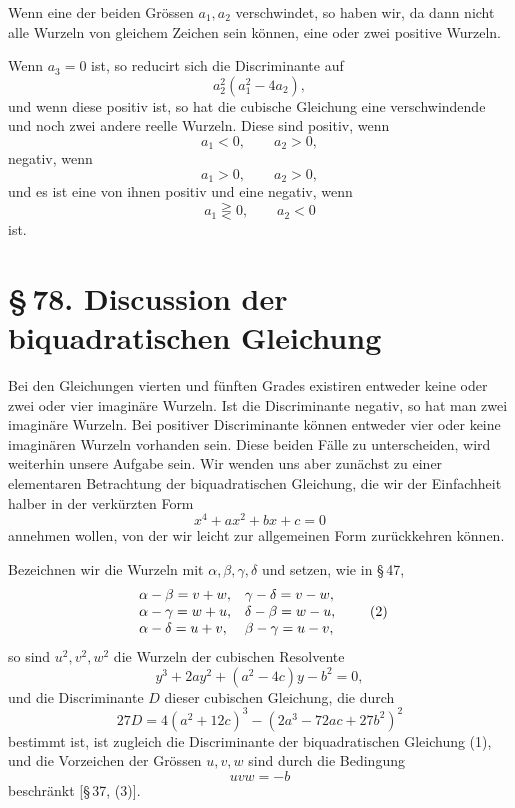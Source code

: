 \documentclass[11pt]{article}
\providecommand{\sect}[2]{\section*{\S\,#1. #2}}
\begin{document}
Wenn eine der beiden Gr\"ossen $a_1,a_2$ verschwindet, so haben wir, da dann nicht alle Wurzeln von gleichem Zeichen sein k\"onnen, eine oder zwei positive Wurzeln.

Wenn $a_3=0$ ist, so reducirt sich die Discriminante auf
\[
        a_2^2(a_1^2-4a_2),
\]
und wenn diese positiv ist, so hat die cubische Gleichung eine verschwindende und noch zwei andere reelle Wurzeln. Diese sind positiv, wenn
\[
        a_1<0,\qquad a_2>0,
\]
negativ, wenn
\[
        a_1>0,\qquad a_2>0,
\]
und es ist eine von ihnen positiv und eine negativ, wenn
\[
        a_1\gtreqless 0,\qquad a_2<0
\]
ist.

\sect{78}{Discussion der biquadratischen Gleichung}

Bei den Gleichungen vierten und f\"unften Grades existiren entweder keine oder zwei oder vier imagin\"are Wurzeln. Ist die Discriminante negativ, so hat man zwei imagin\"are Wurzeln. Bei positiver Discriminante k\"onnen entweder vier oder keine imagin\"aren Wurzeln vorhanden sein. Diese beiden F\"alle zu unterscheiden, wird weiterhin unsere Aufgabe sein. Wir wenden uns aber zun\"achst zu einer elementaren Betrachtung der biquadratischen Gleichung, die wir der Einfachheit halber in der verk\"urzten Form
\begin{equation}
        x^4+ax^2+bx+c=0
\tag{1}
\end{equation}
annehmen wollen, von der wir leicht zur allgemeinen Form zur\"uckkehren k\"onnen.

Bezeichnen wir die Wurzeln mit $\alpha,\beta,\gamma,\delta$ und setzen, wie in \S\,47,
\begin{equation}
\begin{array}{ll}
\alpha-\beta=v+w, & \gamma-\delta=v-w,\cr
\alpha-\gamma=w+u, & \delta-\beta=w-u,\cr
\alpha-\delta=u+v, & \beta-\gamma=u-v,
\end{array}
\tag{2}
\end{equation}
so sind $u^2,v^2,w^2$ die Wurzeln der cubischen Resolvente
\begin{equation}
        y^3+2ay^2+(a^2-4c)y-b^2=0,
\tag{3}
\end{equation}
und die Discriminante $D$ dieser cubischen Gleichung, die durch
\begin{equation}
        27D=4(a^2+12c)^3-(2a^3-72ac+27b^2)^2
\tag{4}
\end{equation}
bestimmt ist, ist zugleich die Discriminante der biquadratischen Gleichung (1), und die Vorzeichen der Gr\"ossen $u,v,w$ sind durch die Bedingung
\begin{equation}
        uvw=-b
\tag{5}
\end{equation}
beschr\"ankt [\S\,37, (3)].
\end{document}
